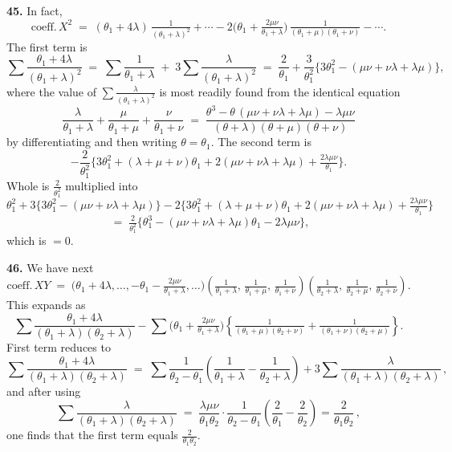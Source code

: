 \documentclass[11pt,a4paper]{article}
\begin{document}
\medskip

\textbf{45.} In fact,
\[
\text{coeff.}\, X^{2} \;=\; (\theta_{1}+4\lambda)\,\tfrac{1}{(\theta_{1}+\lambda)^{2}} + \cdots - 2\bigl(\theta_{1}+\tfrac{2\mu\nu}{\theta_{1}+\lambda}\bigr)\,\tfrac{1}{(\theta_{1}+\mu)(\theta_{1}+\nu)} - \cdots.
\]
The first term is
\[
\sum\frac{\theta_{1}+4\lambda}{(\theta_{1}+\lambda)^{2}} \;=\; \sum\frac{1}{\theta_{1}+\lambda} \;+\; 3\sum\frac{\lambda}{(\theta_{1}+\lambda)^{2}} \;=\; \frac{2}{\theta_{1}} + \frac{3}{\theta_{1}^{2}}\bigl\{3\theta_{1}^{2}-(\mu\nu+\nu\lambda+\lambda\mu)\bigr\},
\]
where the value of $\sum\tfrac{\lambda}{(\theta_{1}+\lambda)^{2}}$ is most readily found from the identical equation
\[
\frac{\lambda}{\theta_{1}+\lambda}+\frac{\mu}{\theta_{1}+\mu}+\frac{\nu}{\theta_{1}+\nu} \;=\; \frac{\theta^{3}-\theta\,(\mu\nu+\nu\lambda+\lambda\mu)-\lambda\mu\nu}{(\theta+\lambda)(\theta+\mu)(\theta+\nu)}
\]
by differentiating and then writing $\theta=\theta_{1}$. The second term is
\[
-\frac{2}{\theta_{1}^{2}}\bigl\{3\theta_{1}^{2} + (\lambda+\mu+\nu)\theta_{1} + 2(\mu\nu+\nu\lambda+\lambda\mu)+\tfrac{2\lambda\mu\nu}{\theta_{1}}\bigr\}.
\]
Whole is $\tfrac{2}{\theta_{1}^{2}}$ multiplied into
\[
\theta_{1}^{2} + 3\bigl\{3\theta_{1}^{2}-(\mu\nu+\nu\lambda+\lambda\mu)\bigr\} - 2\bigl\{3\theta_{1}^{2}+(\lambda+\mu+\nu)\theta_{1}+2(\mu\nu+\nu\lambda+\lambda\mu)+\tfrac{2\lambda\mu\nu}{\theta_{1}}\bigr\}
\]
\[
\;=\; \tfrac{2}{\theta_{1}^{2}}\bigl\{\theta_{1}^{3} - (\mu\nu+\nu\lambda+\lambda\mu)\theta_{1} - 2\lambda\mu\nu\bigr\},
\]
which is $=0$.

\medskip

\textbf{46.} We have next
\[
\text{coeff.}\, XY \;=\; \bigl(\theta_{1}+4\lambda,\ldots,-\theta_{1}-\tfrac{2\mu\nu}{\theta_{1}+\lambda},\ldots\bigr)\!\left(\tfrac{1}{\theta_{1}+\lambda},\,\tfrac{1}{\theta_{1}+\mu},\,\tfrac{1}{\theta_{1}+\nu}\right)\!\left(\tfrac{1}{\theta_{2}+\lambda},\,\tfrac{1}{\theta_{2}+\mu},\,\tfrac{1}{\theta_{2}+\nu}\right).
\]
This expands as
\[
\sum\frac{\theta_{1}+4\lambda}{(\theta_{1}+\lambda)(\theta_{2}+\lambda)} - \sum\bigl(\theta_{1}+\tfrac{2\mu\nu}{\theta_{1}+\lambda}\bigr)\!\left\{\tfrac{1}{(\theta_{1}+\mu)(\theta_{2}+\nu)} + \tfrac{1}{(\theta_{1}+\nu)(\theta_{2}+\mu)}\right\}.
\]
First term reduces to
\[
\sum\frac{\theta_{1}+4\lambda}{(\theta_{1}+\lambda)(\theta_{2}+\lambda)} \;=\; \sum\frac{1}{\theta_{2}-\theta_{1}}\!\left(\frac{1}{\theta_{1}+\lambda}-\frac{1}{\theta_{2}+\lambda}\right) + 3\sum\frac{\lambda}{(\theta_{1}+\lambda)(\theta_{2}+\lambda)}\,,
\]
and after using
\[
\sum\frac{\lambda}{(\theta_{1}+\lambda)(\theta_{2}+\lambda)} \;=\; \frac{\lambda\mu\nu}{\theta_{1}\theta_{2}}\cdot\frac{1}{\theta_{2}-\theta_{1}}\!\left(\frac{2}{\theta_{1}}-\frac{2}{\theta_{2}}\right) = \frac{2}{\theta_{1}\theta_{2}}\,,
\]
one finds that the first term equals $\tfrac{2}{\theta_{1}\theta_{2}}$.
\end{document}
